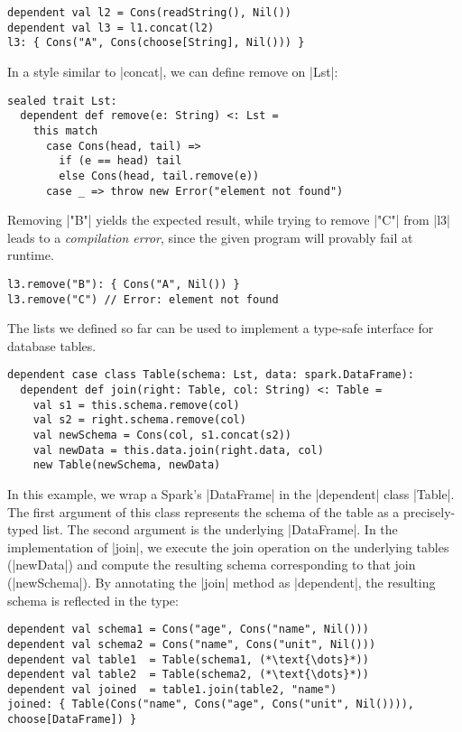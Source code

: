 \begin{lstlisting}
dependent val l2 = Cons(readString(), Nil())
dependent val l3 = l1.concat(l2)
l3: { Cons("A", Cons(choose[String], Nil())) }
\end{lstlisting}

In a style similar to |concat|, we can define remove on |Lst|:

\begin{lstlisting}
sealed trait Lst:
  dependent def remove(e: String) <: Lst =
    this match
      case Cons(head, tail) =>
        if (e == head) tail
        else Cons(head, tail.remove(e))
      case _ => throw new Error("element not found")
\end{lstlisting}

\noindent
Removing |"B"| yields the expected result, while trying to remove |"C"| from |l3| leads to a \emph{compilation error}, since the given program will provably fail at runtime.

\begin{lstlisting}
l3.remove("B"): { Cons("A", Nil()) }
l3.remove("C") // Error: element not found
\end{lstlisting}

The lists we defined so far can be used to implement a type-safe interface for database tables.

\begin{lstlisting}
dependent case class Table(schema: Lst, data: spark.DataFrame):
  dependent def join(right: Table, col: String) <: Table =
    val s1 = this.schema.remove(col)
    val s2 = right.schema.remove(col)
    val newSchema = Cons(col, s1.concat(s2))
    val newData = this.data.join(right.data, col)
    new Table(newSchema, newData)
\end{lstlisting}

\noindent
In this example, we wrap a Spark's |DataFrame| in the |dependent| class |Table|.
The first argument of this class represents the schema of the table as a precisely-typed list.
The second argument is the underlying |DataFrame|.
In the implementation of |join|, we execute the join operation on the underlying tables (|newData|) and compute the resulting schema corresponding to that join (|newSchema|).
By annotating the |join| method as |dependent|, the resulting schema is reflected in the type:

\begin{lstlisting}
dependent val schema1 = Cons("age", Cons("name", Nil()))
dependent val schema2 = Cons("name", Cons("unit", Nil()))
dependent val table1  = Table(schema1, (*\text{\dots}*))
dependent val table2  = Table(schema2, (*\text{\dots}*))
dependent val joined  = table1.join(table2, "name")
joined: { Table(Cons("name", Cons("age", Cons("unit", Nil()))), choose[DataFrame]) }
\end{lstlisting}

